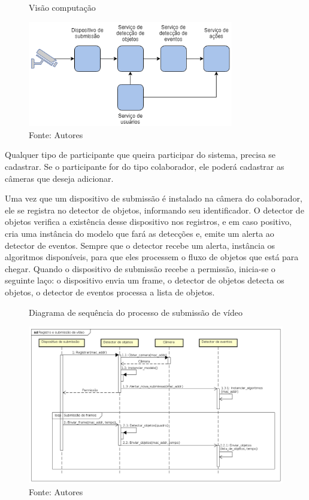 \documentclass[]{politex}
\begin{document}
\begin{figure}[H]
    \centering
    \caption{Visão computação}
    \includegraphics[width=0.8\textwidth]{Visao_Computacao}
    \caption*{Fonte: Autores}
    \label{fig:visaoComputacao}
\end{figure}

Qualquer tipo de participante que queira participar do sistema, precisa se cadastrar. Se o participante for do tipo colaborador, ele poderá cadastrar as câmeras que deseja adicionar.

Uma vez que um dispositivo de submissão é instalado na câmera do colaborador, ele se registra no detector de objetos, informando seu identificador. O detector de objetos verifica a existência desse dispositivo nos registros, e em caso positivo, cria uma instância do modelo que fará as detecções e, emite um alerta ao detector de eventos. Sempre que o detector recebe um alerta, instância os algoritmos disponíveis, para que eles processem o fluxo de objetos que está para chegar. Quando o dispositivo de submissão recebe a permissão, inicia-se o seguinte laço: o dispositivo envia um frame, o detector de objetos detecta os objetos, o detector de eventos processa a lista de objetos.

\begin{figure}[H]
    \centering
    \caption{Diagrama de sequência do processo de submissão de vídeo}
    \includegraphics[width=\textwidth]{Registro_e_submissao_video}
    \caption*{Fonte: Autores}
    \label{fig:registro}
\end{figure}
\end{document}
